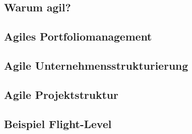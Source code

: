 \subsection{Warum agil?}

\subsection{Agiles Portfoliomanagement}

\subsection{Agile Unternehmensstrukturierung}

\subsection{Agile Projektstruktur}

\subsection{Beispiel Flight-Level}
